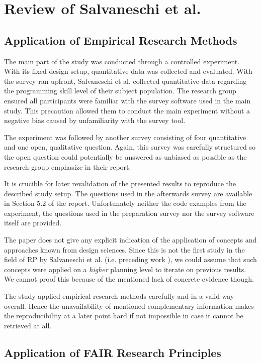 \documentclass[12pt,a4paper]{article}
\begin{document}
\section{Review of Salvaneschi et al.}
\label{sec:review}

\subsection{Application of Empirical Research Methods}

The main part of the study was conducted through a controlled experiment. With its fixed-design setup, quantitative data was collected and evaluated. With the survey ran upfront, Salvaneschi et al. collected quantitative data regarding the programming skill level of their subject population. The research group ensured all participants were familiar with the survey software used in the main study. This precaution allowed them to conduct the main experiment without a negative bias caused by unfamiliarity with the survey tool.

The experiment was followed by another survey consisting of four quantitative and one open, qualitative question. Again, this survey was carefully structured so the open question could potentially be answered as unbiased as possible as the research group emphasize in their report.

It is crucible for later revalidation of the presented results to reproduce the described study setup. The questions used in the afterwards survey are available in Section 5.2 of the report. Unfortunately neither the code examples from the experiment, the questions used in the preparation survey nor the survey software itself are provided.

The paper does not give any explicit indication of the application of concepts and approaches known from design sciences. Since this is not the first study in the field of RP by Salvaneschi et al. (i.e. preceding work \cite{Salvaneschi:2014:ESP:2635868.2635895}), we could assume that such concepts were applied on a \emph{higher} planning level to iterate on previous results. We cannot proof this because of the mentioned lack of concrete evidence though.

The study applied empirical research methods carefully and in a valid way overall. Hence the unavailability of mentioned complementary information makes the reproducibility at a later point hard if not impossible in case it cannot be retrieved at all.

\subsection{Application of FAIR Research Principles}
\end{document}
